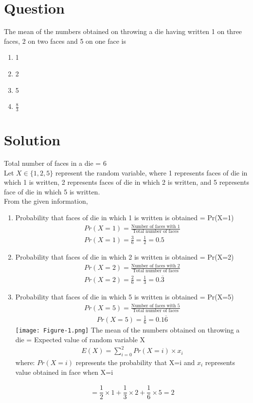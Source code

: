 \documentclass[journal,12pt,twocolumn]{IEEEtran}
\begin{document}
\section*{Question}
The mean of the numbers obtained on throwing
a die having written 1 on three faces, 2 on
two faces and 5 on one face is
\begin{enumerate}[label=\Alph*)]
    \item 1
    \item 2
    \item 5
    \item $\frac{8}{3}$
\end{enumerate}
\section*{Solution}
Total number of faces in a die = 6
\\Let $X \in \{1,2,5\}$ represent the random variable, where 1 represents faces of die in which 1 is written, 2 represents faces of die in which 2 is written, and 5 represents face of die in which 5 is written. \\From the given information, 
\begin{enumerate}
    
\item Probability that faces of die in which 1 is written is obtained = Pr(X=1)
\begin{align}
    Pr(X=1) = \frac{\mbox{Number of faces with 1}}{\mbox{Total number of faces}}\\
    Pr(X=1) = \frac{3}{6} = \frac{1}{2} = 0.5
\end{align}
\item Probability that faces of die in which 2 is written is obtained = Pr(X=2)
\begin{align}
    Pr(X=2) = \frac{\mbox{Number of faces with 2}}{\mbox{Total number of faces}}\\
    Pr(X=2) = \frac{2}{6} = \frac{1}{3} = 0.\overline{3}
\end{align}
\item Probability that faces of die in which 5 is written is obtained = Pr(X=5)
\begin{align}
    Pr(X=5) = \frac{\mbox{Number of faces with 5}}{\mbox{Total number of faces}}
\end{align}
\begin{align}
    Pr(X=5) = \frac{1}{6} = 0.1\overline{6}
\end{align}
\texttt{[image: Figure-1.png]}
The mean of the numbers obtained on throwing
a die = Expected value of random variable X
\begin{align}
E(X) = \sum_{i = 0}^{2} Pr(X=i) \times x_{i}
\end{align}
where: $Pr(X=i)$ represents the probability that X=i and $x_{i}$ represents value obtained in face when X=i

\begin{align}
= \dfrac{1}{2} \times 1 + \dfrac{1}{3} \times 2 + \dfrac{1}{6} \times 5 = 2
\end{align}
\bigskip
{}
\end{enumerate}
\end{document}
